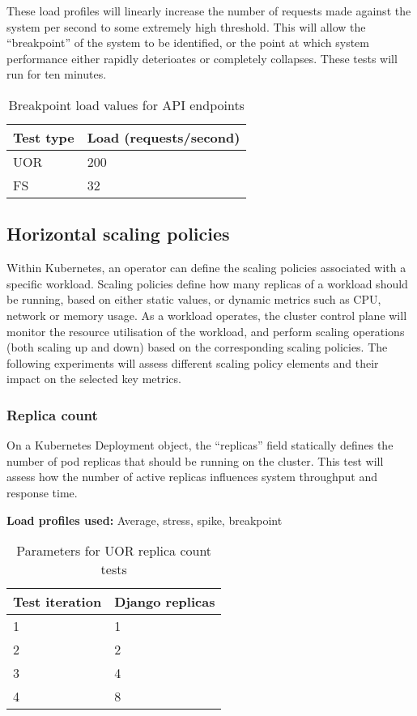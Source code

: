 These load profiles will linearly increase the number of requests made against the system per second to some extremely high threshold. This will allow the ``breakpoint'' of the system to be identified, or the point at which system performance either rapidly deterioates or completely collapses. These tests will run for ten minutes.

\begin{table}[h]
    \centering
    \begin{tabularx}{\textwidth}{|X|X|}
        \hline
        \textbf{Test type} & \textbf{Load (requests/second)}  \\ \hline
        UOR & 200 \\ \hline
        FS & 32 \\ \hline
    \end{tabularx}
    \caption{Breakpoint load values for API endpoints}
    \label{table:test-breakpoint-load-plan}
\end{table}

\subsection{Horizontal scaling policies}

Within Kubernetes, an operator can define the scaling policies associated with a specific workload. Scaling policies define how many replicas of a workload should be running, based on either static values, or dynamic metrics such as CPU, network or memory usage. As a workload operates, the cluster control plane will monitor the resource utilisation of the workload, and perform scaling operations (both scaling up and down) based on the corresponding scaling policies. The following experiments will assess different scaling policy elements and their impact on the selected key metrics.

\subsubsection{Replica count}

On a Kubernetes Deployment object, the ``replicas'' field statically defines the number of pod replicas that should be running on the cluster. This test will assess how the number of active replicas influences system throughput and response time.

\noindent\textbf{Load profiles used:} Average, stress, spike, breakpoint

\begin{table}[h]
    \centering
    \begin{tabularx}{\textwidth}{|X|X|}
        \hline
        \textbf{Test iteration} & \textbf{Django replicas}  \\ \hline
        1 & 1 \\ \hline
        2 & 2 \\ \hline
        3 & 4 \\ \hline
        4 & 8 \\ \hline
    \end{tabularx}
    \caption{Parameters for UOR replica count tests}
    \label{table:test-replica-count-uor}
\end{table}

